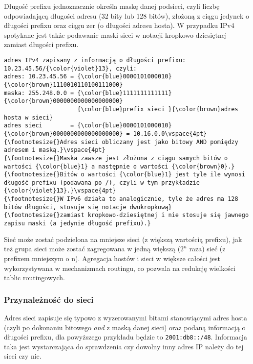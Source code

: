 Długość prefixu jednoznacznie określa maskę danej podsieci, czyli liczbę odpowiadającą długości adresu (32 bity lub 128 bitów), złożoną z ciągu jedynek o długości prefixu oraz ciągu zer (o długości adresu hosta). W przypadku IPv4 spotykane jest także podawanie maski sieci w notacji kropkowo-dziesiętnej zamiast długości prefixu.

\begin{Verbatim}[frame=single,label=\textrm{\bfseries Przykład},commandchars=\\\{\},commentchar=\%]
adres IPv4 zapisany z informacją o długości prefixu: 10.23.45.56/{\color{violet}13}, czyli:
adres: 10.23.45.56 = {\color{blue}0000101000010}{\color{brown}1110010110100111000}
maska: 255.248.0.0 = {\color{blue}1111111111111}{\color{brown}0000000000000000000}
                     {\color{blue}prefix sieci }{\color{brown}adres hosta w sieci}
adres sieci        = {\color{blue}0000101000010}{\color{brown}0000000000000000000} = 10.16.0.0\vspace{4pt}
{\footnotesize{}Adres sieci obliczany jest jako bitowy AND pomiędzy adresem i maską.}\vspace{4pt}
{\footnotesize{}Maska zawsze jest złożona z ciągu samych bitów o wartości {\color{blue}1} a następnie o wartości {\color{brown}0}.}
{\footnotesize{}Bitów o wartości {\color{blue}1} jest tyle ile wynosi długość prefixu (podawana po /), czyli w tym przykładzie {\color{violet}13}.}\vspace{4pt}
{\footnotesize{}W IPv6 działa to analogicznie, tyle że adres ma 128 bitów długości, stosuje się notacje dwukropkową}
{\footnotesize{}zamiast kropkowo-dziesiętnej i nie stosuje się jawnego zapisu maski (a jedynie długość prefixu).}
\end{Verbatim}

Sieć może zostać podzielona na mniejsze sieci (z większą wartością prefixu), jak też grupa sieci może zostać zagregowana w jedną większą ($2^n$ raza) sieć (z prefixem mniejszym o n). Agregacja hostów i sieci w większe całości jest wykorzystywana w mechanizmach routingu, co pozwala na redukcję wielkości tablic routingowych.

\subsubsection{Przynależność do sieci}
Adres sieci zapisuje się typowo z wyzerowanymi bitami stanowiącymi adres hosta (czyli po dokonaniu bitowego \emph{and} z maską danej sieci) oraz podaną informacją o długości prefixu, dla powyższego przykładu będzie to \Verb$2001:db8::/48$. Informacja taka jest wystarczająca do sprawdzenia czy dowolny inny adres IP należy do tej sieci czy nie.

